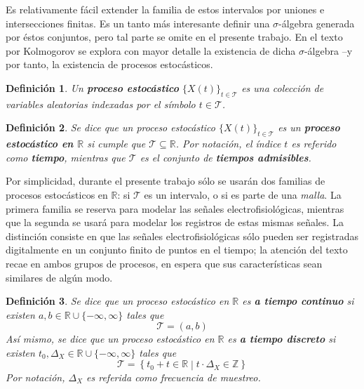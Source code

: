 \documentclass[12pt,letterpaper]{book}
\newtheorem{definicion}{Definición}[chapter]
\newcommand{\R}{\mathbb{R}}
\newcommand{\Z}{\mathbb{Z}}
\newcommand{\xt}{$\{X(t)\}_{t\in \mathcal{T}}$ }
\newcommand{\talque}{\mathrel{}\middle|\mathrel{}}
\begin{document}
Es relativamente fácil extender la familia de estos intervalos por uniones e intersecciones finitas. %
Es un tanto más interesante definir una $\sigma$-álgebra generada por éstos conjuntos, pero tal parte se omite en el presente trabajo.
%
En el texto por Kolmogorov se explora con mayor detalle la existencia de dicha $\sigma$-álgebra --y por tanto, la existencia de procesos estocásticos.

\begin{definicion}
Un \textbf{proceso estocástico} \xt es una colección de variables aleatorias indexadas por el símbolo $t\in\mathcal{T}$.
\end{definicion}

\begin{definicion}
Se dice que un proceso estocástico \xt es un \textbf{proceso estocástico en $\R$} si cumple que $\mathcal{T} \subseteq \R$.
%
Por notación, el índice $t$ es referido como \textbf{tiempo}, mientras que $\mathcal{T}$ es el conjunto de \textbf{tiempos admisibles}.
\end{definicion}

Por simplicidad, durante el presente trabajo sólo se usarán dos familias de procesos estocásticos en $\R$: si $\mathcal{T}$ es un intervalo, o si es parte de una \textit{malla}. 
%
La primera familia se reserva para modelar las señales electrofisiológicas, mientras que la segunda se usará para modelar los registros de estas mismas señales.
%
La distinción consiste en que las señales electrofisiológicas sólo pueden ser registradas digitalmente en un conjunto finito de puntos en el tiempo; la atención del texto recae en ambos grupos de procesos, en espera que sus características sean similares de algún modo.

\begin{definicion}
Se dice que un proceso estocástico en $\R$ es \textbf{a tiempo continuo} si existen $a, b \in \R \cup \{ -\infty, \infty \}$ tales que
\begin{equation}
\mathcal{T} = (a,b)
\end{equation}
Así mismo, se dice que un proceso estocástico en $\R$ es \textbf{a tiempo discreto} si existen $t_0, \Delta_X \in \R \cup \{ -\infty, \infty \}$ tales que
\begin{equation}
\mathcal{T} = \left\{ t_0 + t \in \R \talque {t} \cdot {\Delta_X} \in \Z \right\}
\end{equation}
Por notación, $\Delta_X$ es referida como \textit{frecuencia de muestreo}.
\end{definicion}
\end{document}
